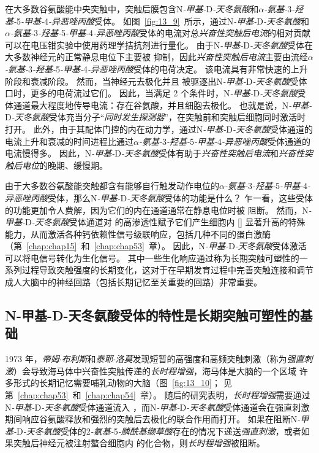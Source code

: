 在大多数谷氨酸能中央突触中，突触后膜包含N\textit{-甲基-}D\textit{-天冬氨酸}和\textit{$\alpha$-氨基-}3\textit{-羟基-}5\textit{-甲基-}4\textit{-异恶唑丙酸}受体。
如图~\ref{fig:13_9}~所示，通过N\textit{-甲基-}D\textit{-天冬氨酸}和\textit{$\alpha$-氨基-}3\textit{-羟基-}5\textit{-甲基-}4\textit{-异恶唑丙酸}受体的电流对总\textit{兴奋性突触后电流}的相对贡献可以在电压钳实验中使用药理学拮抗剂进行量化。
由于N\textit{-甲基-}D\textit{-天冬氨酸}受体在大多数神经元的正常静息电位下主要被  抑制，因此\textit{兴奋性突触后电流}主要由流经\textit{$\alpha$-氨基-}3\textit{-羟基-}5\textit{-甲基-}4\textit{-异恶唑丙酸}受体的电荷决定。
该电流具有非常快速的上升阶段和衰减阶段。
然而，当神经元去极化并且  被驱逐出N\textit{-甲基-}D\textit{-天冬氨酸}受体口时，更多的电荷流过它们。
因此，当满足 2 个条件时，N\textit{-甲基-}D\textit{-天冬氨酸}受体通道最大程度地传导电流：存在谷氨酸，并且细胞去极化。
也就是说，N\textit{-甲基-}D\textit{-天冬氨酸}受体充当分子“\textit{同时发生探测器}”，在突触前和突触后细胞同时激活时打开。
此外，由于其配体门控的内在动力学，通过N\textit{-甲基-}D\textit{-天冬氨酸}受体通道的电流上升和衰减的时间进程比通过\textit{$\alpha$-氨基-}3\textit{-羟基-}5\textit{-甲基-}4\textit{-异恶唑丙酸}受体通道的电流慢得多。
因此，N\textit{-甲基-}D\textit{-天冬氨酸}受体有助于\textit{兴奋性突触后电流}和\textit{兴奋性突触后电位}的晚期、缓慢期。


由于大多数谷氨酸能突触都含有能够自行触发动作电位的\textit{$\alpha$-氨基-}3\textit{-羟基-}5\textit{-甲基-}4\textit{-异恶唑丙酸}受体，那么N\textit{-甲基-}D\textit{-天冬氨酸}受体的功能是什么？
乍一看，这些受体的功能更加令人费解，因为它们的内在通道通常在静息电位时被  阻断。
然而，N\textit{-甲基-}D\textit{-天冬氨酸}受体通道对  的高渗透性赋予它们产生细胞内 [] 显著升高的特殊能力，从而激活各种钙依赖性信号级联响应，包括几种不同的蛋白激酶（第~\ref{chap:chap15}~和~\ref{chap:chap53}~章）。
因此，N\textit{-甲基-}D\textit{-天冬氨酸}受体激活可以将电信号转化为生化信号。
其中一些生化响应通过称为长期突触可塑性的一系列过程导致突触强度的长期变化，这对于在早期发育过程中完善突触连接和调节成人大脑中的神经回路（包括长期记忆至关重要的回路）非常重要。



\subsection{N-甲基-D-天冬氨酸受体的特性是长期突触可塑性的基础}

1973 年，\textit{帝姆$\cdot$布利斯}和\textit{泰耶$\cdot$洛莫}发现短暂的高强度和高频突触刺激（称为\textit{强直刺激}）会导致海马体中兴奋性突触传递的\textit{长时程增强}，海马体是大脑的一个区域 许多形式的长期记忆需要哺乳动物的大脑（图~\ref{fig:13_10}；
见第~\ref{chap:chap53}~和~\ref{chap:chap54}~章）。
随后的研究表明，\textit{长时程增强}需要通过N\textit{-甲基-}D\textit{-天冬氨酸}受体通道流入 ，而N\textit{-甲基-}D\textit{-天冬氨酸}受体通道会在强直刺激期间响应谷氨酸释放和强烈的突触后去极化的联合作用而打开。
如果在阻断N\textit{-甲基-}D\textit{-天冬氨酸}受体的2\textit{-氨基-}5\textit{-膦酰基缬草酸}存在的情况下递送\textit{强直刺激}，或者如果突触后神经元被注射螯合细胞内  的化合物，则\textit{长时程增强}被阻断。


